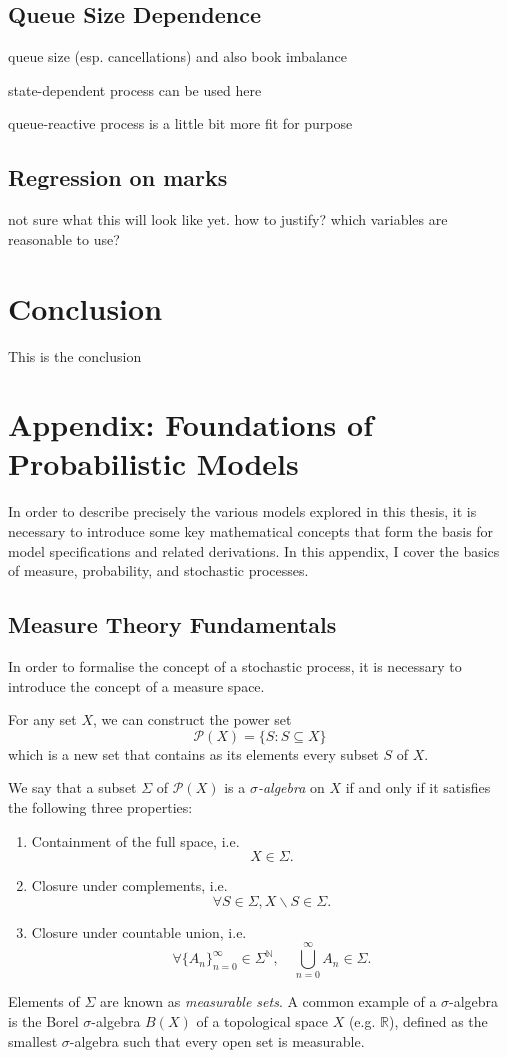 \documentclass[honours,12pt]{unswthesis}
\numberwithin{equation}{section}
\begin{document}
\section{Queue Size Dependence}
queue size (esp. cancellations) and also book imbalance

state-dependent process can be used here

queue-reactive process is a little bit more fit for purpose

\section{Regression on marks}
not sure what this will look like yet. how to justify? which variables are reasonable to use?


\chapter{Conclusion}\label{ccl}


This is the conclusion


\chapter{Appendix: Foundations of Probabilistic Models}
In order to describe precisely the various models explored in this thesis, it is necessary to introduce some key mathematical concepts that form the basis for model specifications and related derivations. In this appendix, I cover the basics of measure, probability, and stochastic processes.

\section{Measure Theory Fundamentals}
In order to formalise the concept of a stochastic process, it is necessary to introduce the concept of a measure space.

For any set $X$, we can construct the power set
$$\mathcal{P}(X) = \{S : S\subseteq X\}$$
which is a new set that contains as its elements every subset $S$ of $X$.

We say that a subset $\Sigma$ of $\mathcal{P}(X)$ is a  \textit{$\sigma$-algebra} on $X$ if and only if it satisfies the following three properties:
\begin{enumerate}
	\item Containment of the full space, i.e. $$X\in\Sigma.$$
	\item Closure under complements, i.e. $$\forall S \in \Sigma, X\backslash S\in\Sigma.$$
	\item Closure under countable union, i.e. $$\forall \{A_n\}_{n=0}^\infty\in\Sigma^{\mathbb{N}},\quad\bigcup_{n=0}^\infty A_n \in \Sigma.$$
\end{enumerate}
Elements of $\Sigma$ are known as \textit{measurable sets}. A common example of a $\sigma$-algebra is the Borel $\sigma$-algebra $B(X)$ of a topological space $X$ (e.g. $\mathbb{R}$), defined as the smallest $\sigma$-algebra such that every open set is measurable.
\end{document}
